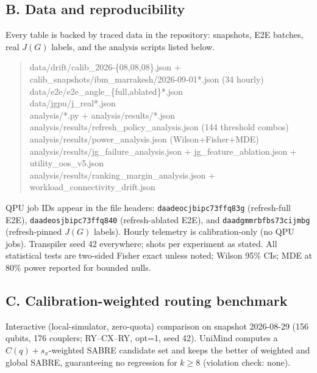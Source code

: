 \documentclass[journal,10pt,twocolumn]{IEEEtran}
\begin{document}
\subsection*{B. Data and reproducibility}
\label{sec:data}
Every table is backed by traced data in the repository: snapshots, E2E batches, real $J(G)$ labels, and the
analysis scripts listed below.
\begin{quote}\small\raggedright\ttfamily
data/drift/calib\_2026-\{08,08,08\}.json +
calib\_snapshots/ibm\_mar\-rakesh/2026-09-01*.json (34 hourly)\\
data/e2e/e2e\_angle\_\{full,ab\-lated\}*.json\\
data/jgpu/j\_real*.json\\
analysis/*.py + analysis/results/*.json\\[2pt]
analysis/results/refresh\_policy\_an\-a\-lysis.json (144 threshold combos)\\
analysis/results/power\_an\-a\-lysis.json (Wilson+Fisher+MDE)\\
analysis/results/jg\_fail\-ure\_an\-a\-lysis.json +
jg\_feature\_ablation.json + utility\_oos\_v5.json\\
analysis/results/ranking\_margin\_analysis.json +
workload\_connectivity\_drift.json\\
\end{quote}
QPU job IDs appear in the file headers:
\texttt{daadeocjbipc73ffq83g} (refresh-full E2E), \texttt{daadeosjbipc73ffq840} (refresh-ablated E2E), and
\texttt{daadgmmrbfbs73cijmbg} (refresh-pinned $J(G)$ labels). Hourly telemetry is calibration-only (no QPU jobs).
Transpiler seed 42 everywhere; shots per experiment as stated. All statistical tests are two-sided Fisher exact
unless noted; Wilson 95\% CIs; MDE at $80\%$ power reported for bounded nulls.

\subsection*{C. Calibration-weighted routing benchmark}
\label{app:routing}
Interactive (local-simulator, zero-quota) comparison on snapshot 2026-08-29 (156 qubits, 176 couplers; RY--CX--RY,
opt=1, seed 42). UniMind computes a $C(q)+s_x$-weighted SABRE candidate set and keeps the better of weighted and
global SABRE, guaranteeing no regression for $k\ge8$ (violation check: none).
\end{document}
